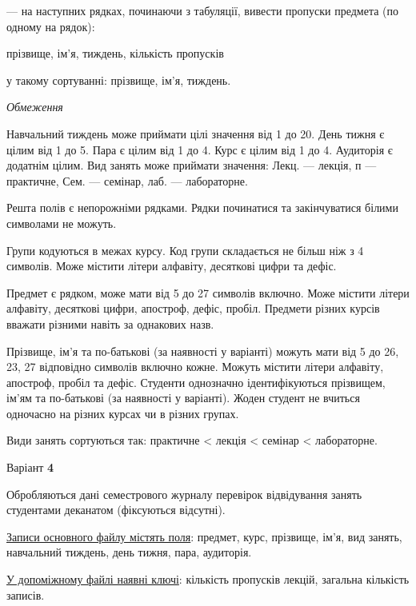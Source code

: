 \documentclass[11pt, ukrainian]{article}
\begin{document}
{\noindent}--- на наступних рядках, починаючи з табуляції, вивести пропуски предмета (по одному на рядок):\par
прізвище, ім’я, тиждень, кількість пропусків

{\noindent}у такому сортуванні: прізвище, ім’я, тиждень.


\bigskip\textit{Обмеження}

Навчальний тиждень може приймати цілі значення від 1 до 20.
День тижня є цілим від 1 до 5. Пара є цілим від 1 до 4.
Курс є цілим від 1 до 4. Аудиторія є додатнім цілим.
Вид занять може приймати значення:
Лекц. --- лекція, п --- практичне, Сем. --- семінар, лаб. --- лабораторне.

Решта полів є непорожніми рядками.
Рядки починатися та закінчуватися білими символами не можуть.

Групи кодуються в межах курсу.
Код групи складається не більш ніж з 4 символів.
Може містити літери алфавіту, десяткові цифри та дефіс.

Предмет є рядком, може мати від 5 до 27 символів включно.
Може містити літери алфавіту, десяткові цифри, апостроф, дефіс, пробіл.
Предмети різних курсів вважати різними навіть за однакових назв.

Прізвище, ім’я та по-батькові (за наявності у варіанті)
можуть мати від 5 до 26, 23, 27 відповідно символів включно кожне.
Можуть містити літери алфавіту, апостроф, пробіл та дефіс.
Студенти однозначно ідентифікуються прізвищем, ім’ям та по-батькові (за наявності у варіанті).
Жоден студент не вчиться одночасно на різних курсах чи в різних групах.

Види занять сортуються так: практичне < лекція < семінар < лабораторне.



\par
\newpage
{\center Варіант  \No \textbf { 4 }\par}
\bigskip
Обробляються дані семестрового журналу перевірок відвідування занять студентами деканатом (фіксуються відсутні). 

\underline{Записи основного файлу містять поля}: предмет, курс, прізвище, ім’я, вид занять, навчальний тиждень, день тижня, пара, аудиторія.

\underline{У допоміжному файлі наявні ключі}: кількість пропусків лекцій, загальна кількість записів.
\end{document}
